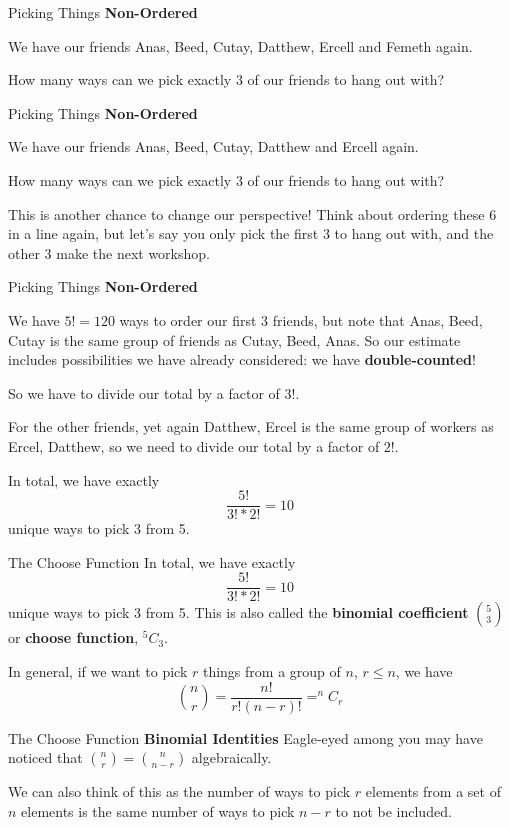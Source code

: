 \documentclass{beamer}
\begin{document}
\begin{frame}{Picking Things}
    \textbf{Non-Ordered}
    
        We have our friends Anas, Beed, Cutay, Datthew, Ercell and Femeth again. 

        How many ways can we pick exactly 3 of our friends to hang out with?
\end{frame}


\begin{frame}{Picking Things}
    \textbf{Non-Ordered}
    
        We have our friends Anas, Beed, Cutay, Datthew and Ercell again. 

        How many ways can we pick exactly 3 of our friends to hang out with?

        This is another chance to change our perspective! Think about ordering these 6 in a line again, but let's say you only pick the first 3 to hang out with, and the other 3 make the next workshop.
\end{frame}

\begin{frame}{Picking Things}
    \textbf{Non-Ordered}
    
        We have $5! = 120$ ways to order our first 3 friends, but note that {Anas, Beed, Cutay} is the same group of friends as {Cutay, Beed, Anas}. So our estimate includes possibilities we have already considered: we have \textbf{double-counted}!
        
        So we have to divide our total by a factor of $3!$. 

        For the other friends, yet again {Datthew, Ercel} is the same group of workers as {Ercel, Datthew}, so we need to divide our total by a factor of $2!$.

        In total, we have exactly $$\frac{5!}{3!*2!} = 10$$ unique ways to pick 3 from 5.
\end{frame}

\begin{frame}{The Choose Function}
    \textbf{}
        In total, we have exactly $$\frac{5!}{3!*2!} = 10$$ unique ways to pick 3 from 5. This is also called the \textbf{binomial coefficient} $\binom{5}{3}$ or \textbf{choose function}, $^5C_3$.

        In general, if we want to pick $r$ things from a group of $n$, $r \leq n$, we have $$\binom{n}{r} = \frac{n!}{r!(n-r)!} = ^nC_r$$
\end{frame}


\begin{frame}{The Choose Function}
    \textbf{Binomial Identities}
        Eagle-eyed among you may have noticed that $\binom{n}{r} = \binom{n}{n-r}$ algebraically. 

        We can also think of this as the number of ways to pick $r$ elements from a set of $n$ elements is the same number of ways to pick $n-r$ to not be included.
\end{frame}
\end{document}
